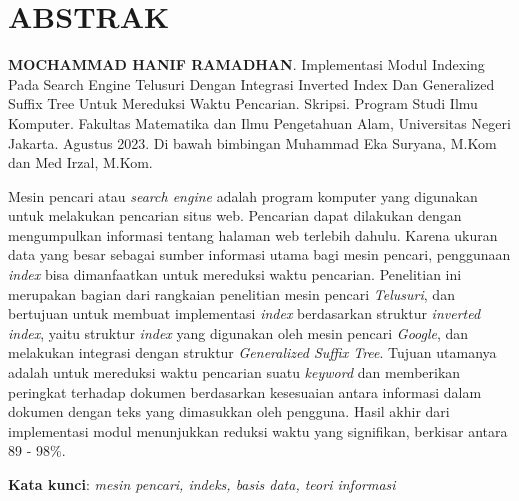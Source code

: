 \chapter*{\textbf{ABSTRAK}}

\textbf{MOCHAMMAD HANIF RAMADHAN}. Implementasi Modul Indexing Pada Search 
Engine Telusuri Dengan Integrasi Inverted Index Dan Generalized Suffix Tree 
Untuk Mereduksi Waktu Pencarian. Skripsi. Program Studi Ilmu Komputer. Fakultas
Matematika dan Ilmu Pengetahuan Alam, Universitas Negeri Jakarta. Agustus 2023.
Di bawah bimbingan Muhammad Eka Suryana, M.Kom dan Med Irzal, M.Kom.

\vspace{5mm}
\noindent{}
Mesin pencari atau \emph{search engine} adalah program komputer yang digunakan 
untuk melakukan pencarian situs web. Pencarian dapat dilakukan dengan 
mengumpulkan informasi tentang halaman web terlebih dahulu. Karena ukuran data 
yang besar sebagai sumber informasi utama bagi mesin pencari, penggunaan
\textit{index} bisa dimanfaatkan untuk mereduksi waktu pencarian.  Penelitian
ini merupakan bagian dari rangkaian penelitian mesin pencari \textit{Telusuri},
dan bertujuan untuk membuat implementasi \textit{index} berdasarkan struktur
\textit{inverted index}, yaitu struktur \textit{index} yang digunakan oleh mesin
pencari \textit{Google}, dan melakukan integrasi dengan struktur
\textit{Generalized Suffix Tree}. Tujuan utamanya adalah untuk mereduksi waktu
pencarian suatu \textit{keyword} dan memberikan peringkat terhadap dokumen
berdasarkan kesesuaian antara informasi dalam dokumen dengan teks yang
dimasukkan oleh pengguna. Hasil akhir dari implementasi modul menunjukkan
reduksi waktu yang signifikan, berkisar antara 89 - 98\%.

\vspace{5mm}
\noindent{}
\textbf{Kata kunci}: \textit{mesin pencari, indeks, basis data, teori informasi}

